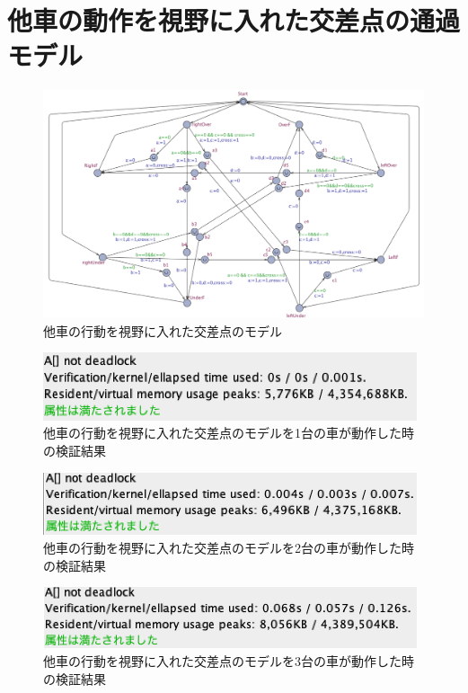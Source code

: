 \documentclass{tpu-sotu}
\begin{document}
	\section{他車の動作を視野に入れた交差点の通過モデル}
	\begin{figure}[htbp]
	\centering
	\includegraphics[width=160mm]{IntersectionBig.png}
	\caption{他車の行動を視野に入れた交差点のモデル}
	\label{IB}
	\end{figure}
	\begin{figure}[htbp]
	\centering
	\includegraphics[width=110mm]{InterBigCar1.png}
	\caption{他車の行動を視野に入れた交差点のモデルを1台の車が動作した時の検証結果}
	\label{IBC1}
	\end{figure}
	\begin{figure}[htbp]
	\centering
	\includegraphics[width=110mm]{InterBigCar2.png}
	\caption{他車の行動を視野に入れた交差点のモデルを2台の車が動作した時の検証結果}
	\label{IBC2}
	\end{figure}
	\begin{figure}[htbp]
	\centering
	\includegraphics[width=110mm]{InterBigCar3.png}
	\caption{他車の行動を視野に入れた交差点のモデルを3台の車が動作した時の検証結果}
	\label{IBC3}
	\end{figure}
\end{document}
